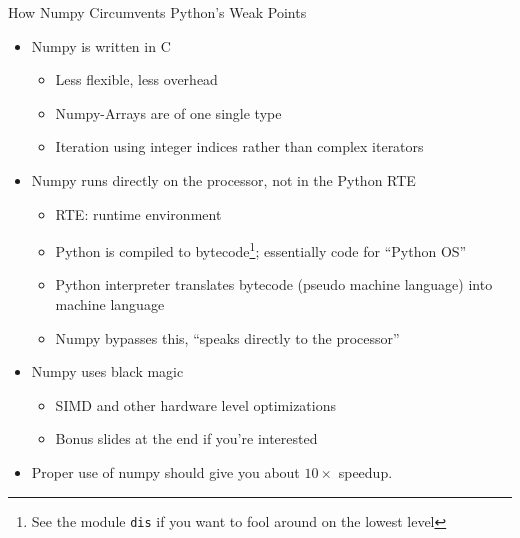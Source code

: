 
\begin{frame}[fragile]{How Numpy Circumvents Python's Weak Points}
%
\begin{itemize}
\item Numpy is written in C
	\begin{itemize}
	\item Less flexible, less overhead
	\item Numpy-Arrays are of one single type
	\item Iteration using integer indices rather than complex iterators
	\end{itemize}
\item Numpy runs directly on the processor, not in the Python RTE
	\begin{itemize}
	\item RTE: runtime environment
	\item Python is compiled to bytecode\footnote{%
			See the module \texttt{dis} if you want to fool around on the lowest level
		}; essentially code for \enquote{Python OS}
	\item Python interpreter translates bytecode (pseudo machine language) into machine language
	\item Numpy bypasses this, \enquote{speaks directly to the processor} 
	\end{itemize}
\item Numpy uses black magic
	\begin{itemize}
	\item SIMD and other hardware level optimizations
	\item Bonus slides at the end if you're interested
	\end{itemize}
\item[\Thus] Proper use of numpy should give you about $10\times$ speedup.
\end{itemize}
%
\end{frame}


